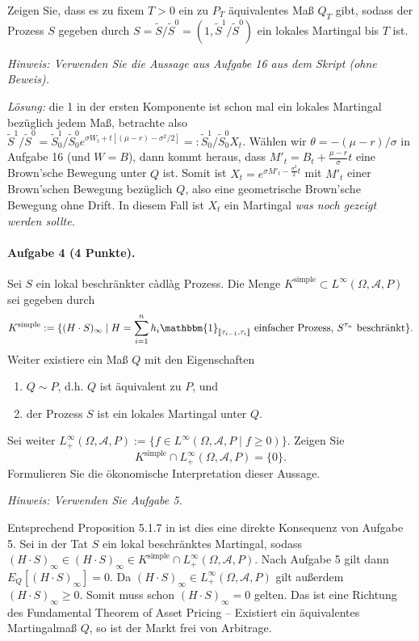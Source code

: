 \documentclass{article}
\begin{document}
Zeigen Sie, dass es zu fixem $T>0$ ein zu $P_T$ äquivalentes Maß $Q_T$ gibt, sodass der Prozess $S$ gegeben durch $S=\tilde{S}/\tilde{S}^0=(1,\tilde{S}^1/\tilde{S}^0)$ ein lokales Martingal bis $T$ ist.

\noindent\emph{Hinweis: Verwenden Sie die Aussage aus Aufgabe 16 aus dem Skript (ohne Beweis).}

\noindent\emph{Lösung:} die 1 in der ersten Komponente ist schon mal ein lokales Martingal bezüglich jedem Maß, betrachte also $\tilde{S}^1/\tilde{S}^0=\tilde{S}^1_0/\tilde{S}^0_0e^{\sigma W_t+t[(\mu-r)-\sigma^2/2]}=:\tilde{S}^1_0/\tilde{S}^0_0 X_t$.
Wählen wir $\theta=-(\mu-r)/\sigma$ in Aufgabe 16 (und $W=B$), dann kommt heraus, dass $M'_t=B_t+\frac{\mu-r}{\sigma}t$ eine Brown'sche Bewegung unter $Q$ ist.
Somit ist $X_t=e^{\sigma M'_t-\frac{\sigma^2}{2}t}$ mit $M'_t$ einer Brown'schen Bewegung bezüglich $Q$, also eine geometrische Brown'sche Bewegung ohne Drift.
In diesem Fall ist $X_t$ ein Martingal \emph{was noch gezeigt werden sollte.}

\paragraph{Aufgabe 4 \textnormal{(4 Punkte)}.}
Sei $S$ ein lokal beschränkter càdlàg Prozess.
Die Menge $K^\text{simple}\subset L^\infty(\Omega,\mathscr{A},P)$ sei gegeben durch
\[
  K^\text{simple}:=\{(H\cdot S)_\infty\mid H=\sum_{i=1}^n h_i\mathbbm{1}_{\rrbracket\tau_{i-1},\tau_i\rrbracket}\text{ einfacher Prozess, $S^{\tau_n}$ beschränkt}\}.
\]
Weiter existiere ein Maß $Q$ mit den Eigenschaften
\begin{enumerate}
\item $Q\sim P$, d.h. $Q$ ist äquivalent zu $P$, und
\item der Prozess $S$ ist ein lokales Martingal unter $Q$.
\end{enumerate}
Sei weiter $L_+^\infty(\Omega,\mathscr{A},P):=\{f\in L^\infty(\Omega,\mathscr{A},P\mid f\geq0)\}$.
Zeigen Sie
\[
K^\text{simple}\cap L^\infty_+(\Omega,\mathscr{A},P)=\{0\}.
\]
Formulieren Sie die ökonomische Interpretation dieser Aussage.

\noindent\emph{Hinweis: Verwenden Sie Aufgabe 5.}

Entsprechend Proposition 5.1.7 in \cite{Delbaen2006} ist dies eine direkte Konsequenz von Aufgabe 5.
Sei in der Tat $S$ ein lokal beschränktes Martingal, sodass $(H\cdot S)_\infty\in (H\cdot S)_\infty\in K^\text{simple}\cap L_+^\infty(\Omega,\mathscr{A},P)$.
Nach Aufgabe 5 gilt dann $E_Q[(H\cdot S)_\infty]=0$.
Da $(H\cdot S)_\infty\in L_+^\infty(\Omega,\mathscr{A},P)$ gilt außerdem $(H\cdot S)_\infty\geq0$.
Somit muss schon $(H\cdot S)_\infty=0$ gelten.
Das ist eine Richtung des Fundamental Theorem of Asset Pricing -- Existiert ein äquivalentes Martingalmaß $Q$, so ist der Markt frei von Arbitrage.
\end{document}
